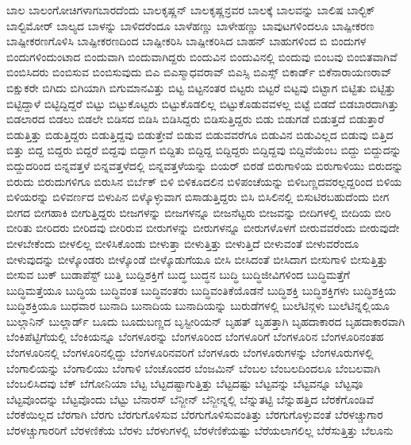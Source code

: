 {ಬಾಲ
ಬಾಲಂಗೋಚಿಗಳಾಗಬಾರದೆಂದು
ಬಾಲಕೃಷ್ಣನ್
ಬಾಲಕೃಷ್ಣನ್ರವರ
ಬಾಲಕ್ಕೆ
ಬಾಲವನ್ನು
ಬಾಲಿಷ
ಬಾಲ್ಟಿಕ್
ಬಾಲ್ಟಿಮೋರ್
ಬಾಲ್ಯದ
ಬಾಳನ್ನು
ಬಾಳಿದರೆಂದೂ
ಬಾಳೆಹಣ್ಣು
ಬಾಳೇಹಣ್ಣು
ಬಾವುಟಗಳಿಂದಲೂ
ಬಾಷ್ಪೀಕರಣ
ಬಾಷ್ಪೀಕರಣಗೊಳಿಸಿ
ಬಾಷ್ಪೀಕರಣದಿಂದ
ಬಾಷ್ಪೀಕರಿಸಿ
ಬಾಷ್ಪೀಕರಿಸಿದ
ಬಾಹನ್
ಬಾಹುಗಳಿಂದ
ಬಿ
ಬಿಂದುಗಳ
ಬಿಂದುಗಳಿಂದುಂಟಾದ
ಬಿಂದುವಾಗಿ
ಬಿಂದುವಾಗಿದ್ದರು
ಬಿಂದುವಿನ
ಬಿಂದುವಿನಲ್ಲಿ
ಬಿಂದುವು
ಬಿಂಬವು
ಬಿಂಬಿತವಾಗಿವೆ
ಬಿಂಬಿಸಿದರು
ಬಿಂಬಿಸುವ
ಬಿಂಬಿಸುವುದು
ಬಿಎ
ಬಿಎಸ್ಮಾಧವರಾವ್
ಬಿಎಸ್ಸಿ
ಬಿಎಸ್ಸ್
ಬಿಕಾರ್ಡ್
ಬಿಕೆನಾರಾಯಣರಾವ್
ಬಿಕ್ಷುಕರೇ
ಬಿಗಿದು
ಬಿಗಿಯಾಗಿ
ಬಿಗುಮಾನವಿತ್ತು
ಬಿಟ್ಟ
ಬಿಟ್ಟನಂತರ
ಬಿಟ್ಟರು
ಬಿಟ್ಟರೆ
ಬಿಟ್ಟವು
ಬಿಟ್ಟಾಗ
ಬಿಟ್ಟಿತು
ಬಿಟ್ಟಿತ್ತು
ಬಿಟ್ಟಿದ್ದಾಳೆ
ಬಿಟ್ಟಿದ್ದಿದ್ದರೆ
ಬಿಟ್ಟು
ಬಿಟ್ಟುಕೊಟ್ಟರು
ಬಿಟ್ಟುಕೊಡಲಿಲ್ಲ
ಬಿಟ್ಟುಕೊಡುವವಳಲ್ಲ
ಬಿಟ್ಟೆ
ಬಿಡದೆ
ಬಿಡಬಾರದಾಗಿತ್ತು
ಬಿಡಲಾರದ
ಬಿಡಲು
ಬಿಡಲೇ
ಬಿಡಿಸದ
ಬಿಡಿಸಿ
ಬಿಡಿಸಿದ್ದರು
ಬಿಡಿಸುತ್ತಿದ್ದರು
ಬಿಡು
ಬಿಡುಗಡೆ
ಬಿಡುತ್ತದೆ
ಬಿಡುತ್ತಾರೆ
ಬಿಡುತ್ತಿತ್ತು
ಬಿಡುತ್ತಿದ್ದರು
ಬಿಡುತ್ತಿದ್ದವು
ಬಿಡುತ್ತೇವೆ
ಬಿಡುವ
ಬಿಡುವವರೆಗೂ
ಬಿಡುವಿನ
ಬಿಡುವಿಲ್ಲದ
ಬಿಡುವು
ಬಿತ್ತಿದ
ಬಿತ್ತು
ಬಿದ್ದ
ಬಿದ್ದರು
ಬಿದ್ದರೆ
ಬಿದ್ದವು
ಬಿದ್ದಾಗ
ಬಿದ್ದಿತು
ಬಿದ್ದಿದ್ದ
ಬಿದ್ದಿದ್ದರು
ಬಿದ್ದಿದ್ದವು
ಬಿದ್ದಿವೆಯೆಂಬ
ಬಿದ್ದು
ಬಿದ್ದುದನ್ನು
ಬಿದ್ದುದರಿಂದ
ಬಿನ್ನವತ್ತಳೆ
ಬಿನ್ನವತ್ತಳೆದಲ್ಲಿ
ಬಿನ್ನವತ್ತಳೆಯನ್ನು
ಬಿಯರ್
ಬಿರಡೆ
ಬಿರುಗಾಳಿಯ
ಬಿರುಗಾಳಿಯು
ಬಿರುದನ್ನು
ಬಿರುದು
ಬಿರುದುಗಳಿಗೂ
ಬಿರುಸಿನ
ಬಿರ್ಬೆಕ್
ಬಿಳಿ
ಬಿಳಿಕೂದಲಿನ
ಬಿಳಿಪಂಚೆಯನ್ನು
ಬಿಳಿಬಣ್ಣದವರಲ್ಲದ್ದರಿಂದ
ಬಿಳಿಯ
ಬಿಳಿಯರನ್ನು
ಬಿಳಿವರ್ಣದ
ಬಿಳುಪಿನ
ಬಿಳ್ಕೊಳ್ಳುವಾಗ
ಬಿಸಾಡುತ್ತಿದ್ದರು
ಬಿಸಿ
ಬಿಸಿಲಿನಲ್ಲಿ
ಬಿಸುಟಿರಬಹುದೆಂದು
ಬೀಗ
ಬೀಗದ
ಬೀಗಹಾಕಿ
ಬೀಗುತ್ತಿದ್ದರು
ಬೀಜಗಳನ್ನು
ಬೀಜಗಳನ್ನೂ
ಬೀಜನೆಟ್ಟರು
ಬೀಜವನ್ನು
ಬೀದಿಗಳಲ್ಲಿ
ಬೀದಿಯ
ಬೀರಿ
ಬೀರಿತು
ಬೀರಿದರು
ಬೀರಿದವು
ಬೀರಿರುವ
ಬೀರುಗಳನ್ನು
ಬೀರುಗಳನ್ನೂ
ಬೀರುಗಳೊಳಗೆ
ಬೀರುವವರೆಂದು
ಬೀರುವುದೇ
ಬೀಳಬೇಕೆಂದು
ಬೀಳಲಿಲ್ಲ
ಬೀಳಿಸಿಕೊಂಡು
ಬೀಳುತ್ತಾ
ಬೀಳುತ್ತಿತ್ತು
ಬೀಳುತ್ತಿದೆ
ಬೀಳುವಂತೆ
ಬೀಳುವರೆಂದೂ
ಬೀಳುವುದನ್ನು
ಬೀಳ್ಕೊಂಡರು
ಬೀಳ್ಕೊಂಡೆ
ಬೀಳ್ಕೊಡುಗೆಯೂ
ಬೀಸಿ
ಬೀಸಿದಂತೆ
ಬೀಸಿದಾಗ
ಬೀಸುಗಾಳಿ
ಬೀಸುತ್ತಿತ್ತು
ಬೀಸುವ
ಬುಕ್
ಬುಡಾಪೆಸ್ಟ್
ಬುತ್ತಿ
ಬುದ್ದಿಶಕ್ತಿಗೆ
ಬುದ್ಧ
ಬುದ್ಧನ
ಬುದ್ಧಿ
ಬುದ್ಧಿಜೀವಿಗಳಿಂದ
ಬುದ್ಧಿಮತ್ತೆಗೆ
ಬುದ್ಧಿಮತ್ತೆಯೂ
ಬುದ್ಧಿಯ
ಬುದ್ಧಿವಂತ
ಬುದ್ಧಿವಂತರು
ಬುದ್ಧಿವಂತಿಕೆಯೊಡನೆ
ಬುದ್ಧಿಶಕ್ತಿ
ಬುದ್ಧಿಶಕ್ತಿಗಳು
ಬುದ್ಧಿಶಕ್ತಿಯ
ಬುದ್ಧಿಶಕ್ತಿಯೂ
ಬುಧವಾರ
ಬುನಾದಿ
ಬುನಾದಿಯ
ಬುನಾದಿಯನ್ನು
ಬುರುಡೆಗಳಲ್ಲಿ
ಬುಲೆಟಿನ್ಗಳು
ಬುಲೆಟಿನ್ನಲ್ಲಿಯೂ
ಬುಲ್ಗಾನಿನ್
ಬುಲ್ಲಾರ್ಡ್
ಬೂದು
ಬೂದುಬಣ್ಣದ
ಬೃಸ್ಟೀರಿಯನ್
ಬೃಹತ್
ಬೃಹತ್ತಾಗಿ
ಬೃಹದಾಕಾರದ
ಬೃಹದಾಕಾರವಾಗಿ
ಬೆಂಕಿಪೆಟ್ಟಿಗೆಯಲ್ಲಿ
ಬೆಂಕಿಯನ್ನೂ
ಬೆಂಗಳೂರನ್ನು
ಬೆಂಗಳೂರಿಂದ
ಬೆಂಗಳೂರಿಗೆ
ಬೆಂಗಳೂರಿನ
ಬೆಂಗಳೂರಿನಂತಹ
ಬೆಂಗಳೂರಿನಲ್ಲಿ
ಬೆಂಗಳೂರಿನಲ್ಲಿದ್ದು
ಬೆಂಗಳೂರಿನವರಿಗೆ
ಬೆಂಗಳೂರು
ಬೆಂಗಳೂರುಗಳನ್ನು
ಬೆಂಗಳೂರುಗಳಲ್ಲಿ
ಬೆಂಗಾಲಿಯನ್ನು
ಬೆಂಗಾಲಿಯು
ಬೆಂಗಾಳಿ
ಬೆಂಚೊಂದರ
ಬೆಂಜಮಿನ್
ಬೆಂಬಲ
ಬೆಂಬಲದಿಂದಲೂ
ಬೆಂಬಲವಾಗಿ
ಬೆಂಬಲಿಸಿದವು
ಬೆಕ್
ಬೆಗೋನಿಯಾ
ಬೆಟ್ಟ
ಬೆಟ್ಟದಷ್ಟಾಗುತ್ತಿತ್ತು
ಬೆಟ್ಟದಷ್ಟು
ಬೆಟ್ಟವನ್ನು
ಬೆಟ್ಟವನ್ನೂ
ಬೆಟ್ಟವೂ
ಬೆಟ್ಟವೊಂದನ್ನು
ಬೆಟ್ಟವೊಂದು
ಬೆಟ್ಟು
ಬೆನಾರಸ್
ಬೆನ್ಜೀನ್
ಬೆನ್ಜೀನ್ನಲ್ಲಿ
ಬೆನ್ನುತಟ್ಟಿ
ಬೆನ್ನುಹತ್ತಿದ
ಬೆರಕೆಗೊಂಡಿವೆ
ಬೆರಕೆಯಿಲ್ಲದ
ಬೆರಗಾಗಿ
ಬೆರಗು
ಬೆರಗುಗೊಳಿಸುವ
ಬೆರಗುಗೊಳಿಸುವಂತಿತ್ತು
ಬೆರಗುಗೊಳ್ಳುವಂತೆ
ಬೆರಳಚ್ಚುಗಾರ
ಬೆರಳಚ್ಚುಗಾರರಿಗೆ
ಬೆರಳಣಿಕೆಯ
ಬೆರಳು
ಬೆರಳುಗಳಲ್ಲಿ
ಬೆರಳೆಣಿಕೆಯಷ್ಟು
ಬೆರೆಯಲಾಗಲಿಲ್ಲ
ಬೆರೆಸುತ್ತಿತ್ತು
ಬೆಲೂನು
}
